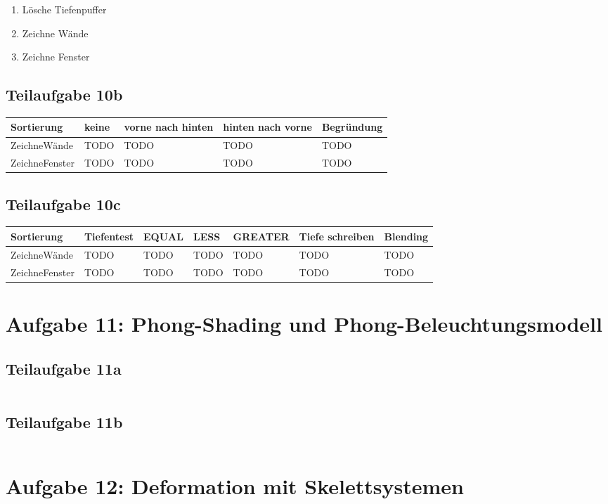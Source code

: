 \documentclass[a4paper]{scrartcl}
\begin{document}
\begin{enumerate}
    \item Lösche Tiefenpuffer
    \item Zeichne Wände
    \item Zeichne Fenster
\end{enumerate}

\subsection*{Teilaufgabe 10b}

\begin{table}[H]
    \begin{tabular}{lllll}
    \toprule
    Sortierung     & keine & vorne nach hinten & hinten nach vorne & Begründung \\\midrule
    ZeichneWände   & TODO  & TODO              & TODO              & TODO       \\
    ZeichneFenster & TODO  & TODO              & TODO              & TODO       \\\bottomrule
    \end{tabular}
\end{table}

\subsection*{Teilaufgabe 10c}
\begin{table}[H]
    \begin{tabular}{lllllll}\toprule
    Sortierung     & Tiefentest & EQUAL & LESS & GREATER & Tiefe schreiben & Blending \\\midrule
    ZeichneWände   & TODO       & TODO  & TODO & TODO    & TODO            & TODO    \\
    ZeichneFenster & TODO       & TODO  & TODO & TODO    & TODO            & TODO   \\\bottomrule
    \end{tabular}
\end{table}

\clearpage
\section*{Aufgabe 11: Phong-Shading und Phong-Beleuchtungsmodell}
\subsection*{Teilaufgabe 11a}
\inputminted[linenos, numbersep=5pt, tabsize=4, frame=lines, label=shader.vert]{glsl}{shader.vert}

\clearpage
\subsection*{Teilaufgabe 11b}
\inputminted[linenos, numbersep=5pt, tabsize=4, frame=lines, label=shader.frag]{glsl}{shader.frag}

\clearpage
\section*{Aufgabe 12: Deformation mit Skelettsystemen}
\inputminted[linenos, numbersep=5pt, tabsize=4, frame=lines, label=skelett.vert]{glsl}{skelett.vert}
\end{document}
